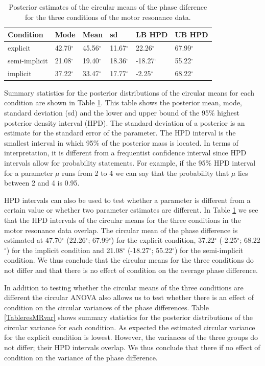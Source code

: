 \documentclass[11pt,]{article}
\begin{document}
\begin{table}
\centering
\caption{Posterior estimates of the circular means of the phase diference for the three conditions of the motor resonance data.} 
\begin{tabular}{llllll}
  \hline\noalign{\smallskip}
Condition & Mode & Mean & sd & LB HPD & UB HPD\\ \hline\noalign{\smallskip}
explicit & 42.70$^\circ$ & 45.56$^\circ$ & 11.67$^\circ$ & 22.26$^\circ$ & 67.99$^\circ$\\
semi-implicit & 21.08$^\circ$ & 19.40$^\circ$ & 18.36$^\circ$ & -18.27$^\circ$ & 55.22$^\circ$\\
implicit & 37.22$^\circ$ & 33.47$^\circ$ & 17.77$^\circ$ & -2.25$^\circ$ & 68.22$^\circ$\\
   \hline
\end{tabular}
\label{TableresMRmean}
\end{table}

Summary statistics for the posterior distributions of the circular means
for each condition are shown in Table \ref{TableresMRmean}. This table
shows the posterior mean, mode, standard deviation (sd) and the lower
and upper bound of the 95\(\%\) highest posterior density interval
(HPD). The standard deviation of a posterior is an estimate for the
standard error of the parameter. The HPD interval is the smallest
interval in which 95\(\%\) of the posterior mass is located. In terms of
interpretation, it is different from a frequentist confidence interval
since HPD intervals allow for probability statements. For example, if
the 95\(\%\) HPD interval for a parameter \(\mu\) runs from 2 to 4 we
can say that the probability that \(\mu\) lies between 2 and 4 is 0.95.

HPD intervals can also be used to test whether a parameter is different
from a certain value or whether two parameter estimates are different.
In Table \ref{TableresMRmean} we see that the HPD intervals of the
circular means for the three conditions in the motor resonance data
overlap. The circular mean of the phase difference is estimated at
47.70\(^\circ\) (22.26\(^\circ\); 67.99\(^\circ\)) for the explicit
condition, 37.22\(^\circ\) (-2.25\(^\circ\); 68.22\(^\circ\)) for the
implicit condition and 21.08\(^\circ\) (-18.27\(^\circ\);
55.22\(^\circ\)) for the semi-implicit condition. We thus conclude that
the circular means for the three conditions do not differ and that there
is no effect of condition on the average phase difference.

In addition to testing whether the circular means of the three
conditions are different the circular ANOVA also allows us to test
whether there is an effect of condition on the circular variances of the
phase differences. Table \ref{TableresMRvar} shows summary statistics
for the posterior distributions of the circular variance for each
condition. As expected the estimated circular variance for the explicit
condition is lowest. However, the variances of the three groups do not
differ; their HPD intervals overlap. We thus conclude that there if no
effect of condition on the variance of the phase difference.
\end{document}

